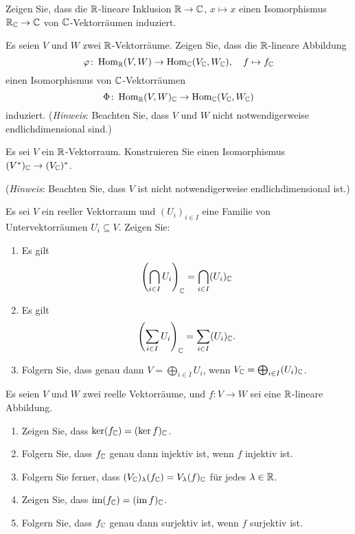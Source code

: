 \begin{question}
  Zeigen Sie, dass die $\mathbb{R}$-lineare Inklusion $\mathbb{R} \to \mathbb{C}$, $x \mapsto x$ einen Isomorphismus $\mathbb{R}_{\mathbb{C}} \to \mathbb{C}$ von $\mathbb{C}$-Vektorräumen induziert.
\end{question}


\begin{question}
  Es seien $V$ und $W$ zwei $\mathbb{R}$-Vektorräume.
  Zeigen Sie, dass die $\mathbb{R}$-lineare Abbildung
  \[
    \varphi \colon \operatorname{Hom}_{\mathbb{R}}(V, W) \to \operatorname{Hom}_{\mathbb{C}}(V_{\mathbb{C}}, W_{\mathbb{C}}),
    \quad
    f \mapsto f_{\mathbb{C}}
  \]
  einen Isomorphismus von $\mathbb{C}$-Vektorräumen
  \[
    \Phi \colon \operatorname{Hom}_{\mathbb{R}}(V, W)_{\mathbb{C}} \to \operatorname{Hom}_{\mathbb{C}}(V_{\mathbb{C}}, W_{\mathbb{C}})
  \]
  induziert.
  \newline
  (\emph{Hinweis}:
   Beachten Sie, dass $V$ und $W$ nicht notwendigerweise endlichdimensional sind.)
\end{question}


\begin{question}
  Es sei $V$ ein $\mathbb{R}$-Vektorraum.
  Konstruieren Sie einen Isomorphismus $(V^*)_{\mathbb{C}} \to (V_{\mathbb{C}})^*$.
  
  (\emph{Hinweis}:
   Beachten Sie, dass $V$ ist nicht notwendigerweise endlichdimensional ist.)
\end{question}


\begin{question}\label{qst: compatibility of sums and intersections with complexification}
  Es sei $V$ ein reeller Vektorraum und $(U_i)_{i \in I}$ eine Familie von Untervektorräumen $U_i \subseteq V$.
  Zeigen Sie:
  \begin{enumerate}[leftmargin=*]
    \item
      Es gilt
      \[
          \left( \bigcap_{i \in I} U_i \right)_{\mathbb{C}}
        = \bigcap_{i \in I} (U_i)_{\mathbb{C}}
      \]
    \item
      Es gilt
      \[
          \left( \sum_{i \in I} U_i \right)_{\mathbb{C}}
        = \sum_{i \in I} (U_i)_{\mathbb{C}}.
      \]
    \item
      Folgern Sie, dass genau dann $V = \bigoplus_{i \in I} U_i$, wenn $V_{\mathbb{C}} = \bigoplus_{i \in I} (U_i)_{\mathbb{C}}$.
  \end{enumerate}
\end{question}


\begin{question}
  Es seien $V$ und $W$ zwei reelle Vektorräume, und $f \colon V \to W$ sei eine $\mathbb{R}$-lineare Abbildung.
  \begin{enumerate}[leftmargin=*]
    \item
      Zeigen Sie, dass $\ker (f_{\mathbb{C}}) = (\ker f)_{\mathbb{C}}$.
    \item
      Folgern Sie, dass $f_{\mathbb{C}}$ genau dann injektiv ist, wenn $f$ injektiv ist.
    \item
      Folgern Sie ferner, dass $(V_{\mathbb{C}})_\lambda(f_{\mathbb{C}}) = V_\lambda(f)_{\mathbb{C}}$ für jedes $\lambda \in \mathbb{R}$.
    \item
      Zeigen Sie, dass $\operatorname{im} (f_{\mathbb{C}}) = (\operatorname{im} f)_{\mathbb{C}}$.
    \item
      Folgern Sie, dass $f_{\mathbb{C}}$ genau dann surjektiv ist, wenn $f$ surjektiv ist.
  \end{enumerate}
\end{question}


